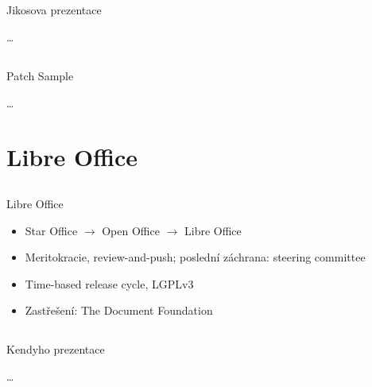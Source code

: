 \documentclass{beamer}
\begin{document}
\subsection{}
\begin{frame}{Jikosova prezentace}
\begin{center}
	\dots
\end{center}
\end{frame}

\subsection{}
\begin{frame}{Patch Sample}
\begin{center}
	\dots
\end{center}
\end{frame}


\section{Libre Office}

\subsection{}
\begin{frame}{Libre Office}
\begin{itemize}
\item Star Office $\rightarrow$ Open Office $\rightarrow$ Libre Office
\item Meritokracie, review-and-push; poslední záchrana: steering committee
\item Time-based release cycle, LGPLv3
\item Zastřešení: The Document Foundation
\end{itemize}
\end{frame}

\subsection{}
\begin{frame}{Kendyho prezentace}
\begin{center}
	\dots
\end{center}
\end{frame}
\end{document}
